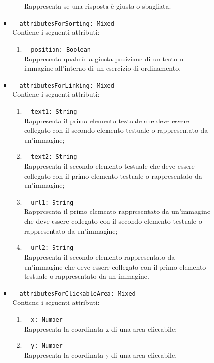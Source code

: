 \begin{itemize}
\begin{itemize}
\begin{itemize}
\begin{itemize}
\begin{enumerate}
							Rappresenta se una risposta è giusta o sbagliata.
						\end{enumerate}      
						\item \texttt{- attributesForSorting: Mixed}\\
						Contiene i seguenti attributi:
						\begin{enumerate}
							\item \texttt{- position: Boolean}\\
							Rappresenta quale è la giusta posizione di un testo o immagine all'interno di un esercizio di ordinamento.
						\end{enumerate}  
						\item \texttt{- attributesForLinking: Mixed}\\
						Contiene i seguenti attributi:
						\begin{enumerate}
							\item \texttt{- text1: String}\\
							Rappresenta il primo elemento testuale che deve essere collegato con il secondo elemento testuale o rappresentato da un'immagine;
							\item \texttt{- text2: String}\\
							Rappresenta il secondo elemento testuale che deve essere collegato con il primo elemento testuale o rappresentato da un'immagine;
							\item \texttt{- url1: String}\\
							Rappresenta il primo elemento rappresentato da un'immagine che deve essere collegato con il secondo elemento testuale o rappresentato da un'immagine;
							\item \texttt{- url2: String}\\
							Rappresenta il secondo elemento rappresentato da un'immagine che deve essere collegato con il primo elemento testuale o rappresentato da un immagine.
						\end{enumerate}  
						\item \texttt{- attributesForClickableArea: Mixed}\\
						Contiene i seguenti attributi:
						\begin{enumerate}
							\item \texttt{- x: Number}\\
							Rappresenta la coordinata x di una area cliccabile;  
							\item \texttt{- y: Number}\\
							Rappresenta la coordinata y di una area cliccabile. 

\end{enumerate}
\end{itemize}
\end{itemize}
\end{itemize}
\end{itemize}
